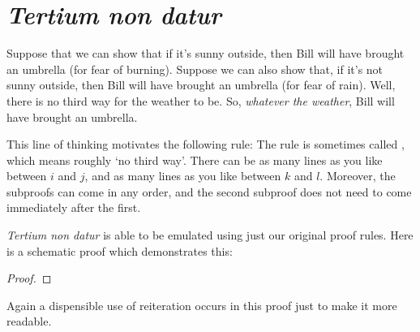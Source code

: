 \section{\emph{Tertium non datur}}

Suppose that we can show that if it's sunny outside, then Bill will have brought an umbrella (for fear of burning). Suppose we can also show that, if it's not sunny outside, then Bill will have brought an umbrella (for fear of rain). Well, there is no third way for the weather to be. So, \emph{whatever the weather}, Bill will have brought an umbrella. 

This line of thinking motivates the following rule:
The rule is sometimes called , which means roughly `no third way'. There can be as many lines as you like between $i$ and $j$, and as many lines as you like between $k$ and $l$. Moreover, the subproofs can come in any order, and the second subproof does not need to come immediately after the first.

\emph{Tertium non datur} is able to be emulated using just our original proof rules. Here is a schematic proof which demonstrates this:
\begin{proof}
		\open
		\close
		\open
		\close
		\have[\ ]{}{\vdots}
		\open
			\open
				\close
			\close
	\end{proof}
Again a dispensible use of reiteration occurs in this proof just to make it more readable.



